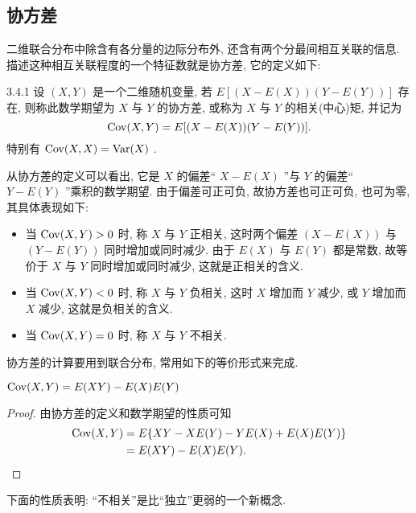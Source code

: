   \subsection{协方差}\label{ssec:3.4.3}
  二维联合分布中除含有各分量的边际分布外, 还含有两个分最间相互关联的信息. 描述这种相互关联程度的一个特征数就是协方差, 它的定义如下:
  \begin{definition}{}{3.4.1}
  	设 $(X,Y)$ 是一个二维随机变量, 若 $E[ ( X-E(X) ) (Y-E(Y)) ]$ 存在, 则称此数学期望为 $X$ 与 $Y$ 的协方差, 或称为 $X$ 与 $Y$ 的相关(中心)矩, 并记为
  	\begin{equation}\label{eq:3.4.7}
  		\operatorname{Cov}(X,Y)=E[ ( X-E(X) ) (Y-E(Y)) ].
  	\end{equation}
  	特别有 $\operatorname{Cov}(X,X)=\operatorname{Var}(X)$ .
  \end{definition}
  从协方差的定义可以看出, 它是 $X$ 的偏差“ $X-E(X)$ ”与 $Y$ 的偏差“ $Y-E(Y)$ ”乘积的数学期望. 由于偏差可正可负, 故协方差也可正可负, 也可为零, 其具体表现如下:
  \begin{itemize}
  	\item 当 $\operatorname{Cov}(X,Y)>0$ 时, 称 $X$ 与 $Y$ 正相关, 这时两个偏差 $(X-E(X))$ 与 $(Y-E(Y))$ 同时增加或同时减少. 由于 $E(X)$ 与 $E(Y)$ 都是常数, 故等价于 $X$ 与 $Y$ 同时增加或同时减少, 这就是正相关的含义.
  	\item 当 $\operatorname{Cov}(X,Y)<0$ 时, 称 $X$ 与 $Y$ 负相关, 这时 $X$ 增加而 $Y$ 减少, 或 $Y$ 增加而 $X$ 减少, 这就是负相关的含义.
  	\item 当 $\operatorname{Cov}(X,Y)=0$ 时, 称 $X$ 与 $Y$ 不相关.
  \end{itemize}
  协方差的计算要用到联合分布, 常用如下的等价形式来完成.
  \begin{property}\label{pro:3.4.4}
  	$\operatorname{Cov}(X, Y)=E(X Y)-E(X) E(Y)$
  	\begin{proof}
  		由协方差的定义和数学期望的性质可知
  		\begin{align*}
  			\operatorname{Cov}(X, Y) &= E\{ XY-XE(Y)-YE(X)+E(X)E(Y) \}\\
  			&=E(XY)-E(X)E(Y).
  		\end{align*}
  	\end{proof}
  \end{property}
	下面的性质表明: “不相关”是比“独立”更弱的一个新概念.
